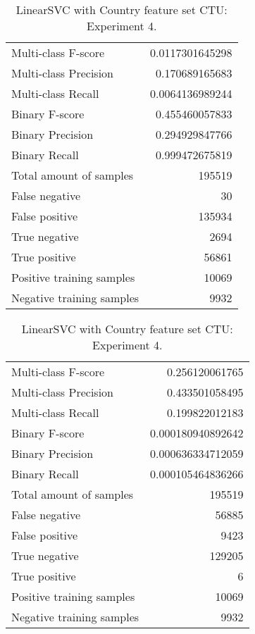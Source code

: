 \begin{table}[H]
\begin{minipage}{0.5\textwidth}
\caption{LinearSVC with Country feature set CTU: Experiment 3.}
\centering
\begin{tabular}{l r}
\toprule
Multi-class F-score & 0.0117301645298 \\
Multi-class Precision & 0.170689165683 \\
Multi-class Recall & 0.0064136989244 \\
\midrule
Binary F-score & 0.455460057833 \\
Binary Precision & 0.294929847766 \\
Binary Recall & 0.999472675819 \\
\midrule
Total amount of samples & 195519 \\
False negative & 30 \\
False positive & 135934 \\
True negative & 2694 \\
True positive & 56861 \\
\midrule
Positive training samples & 10069 \\
Negative training samples & 9932 \\
\bottomrule
\end{tabular}
\end{minipage}
\hfillx
\begin{minipage}{0.5\textwidth}
\caption{LinearSVC with Country feature set CTU: Experiment 4.}
\centering
\begin{tabular}{l r}
\toprule
Multi-class F-score & 0.256120061765 \\
Multi-class Precision & 0.433501058495 \\
Multi-class Recall & 0.199822012183 \\
\midrule
Binary F-score & 0.000180940892642 \\
Binary Precision & 0.000636334712059 \\
Binary Recall & 0.000105464836266 \\
\midrule
Total amount of samples & 195519 \\
False negative & 56885 \\
False positive & 9423 \\
True negative & 129205 \\
True positive & 6 \\
\midrule
Positive training samples & 10069 \\
Negative training samples & 9932 \\
\bottomrule
\end{tabular}
\end{minipage}
\end{table}
